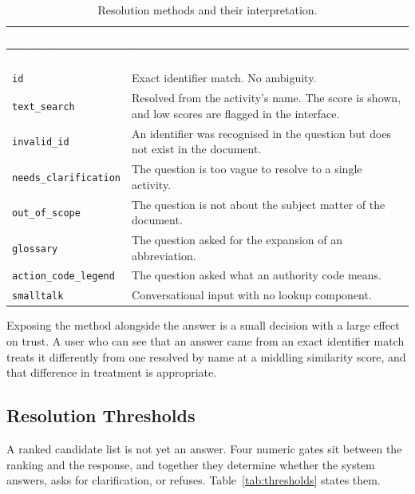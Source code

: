 \begin{longtable}{|p{}|p{}|}
\caption{Resolution methods and their interpretation.}\label{tab:methods}\\
\hline
\rowcolor{myblue}\textcolor{white}{\textbf{Method}} & \textcolor{white}{\textbf{Interpretation}} \\
\hline
\endfirsthead
\hline
\rowcolor{myblue}\textcolor{white}{\textbf{Method}} & \textcolor{white}{\textbf{Interpretation}} \\
\hline
\endhead
\texttt{id} & Exact identifier match. No ambiguity. \\ \hline
\texttt{text\_search} & Resolved from the activity's name. The score is shown, and low scores are flagged in the interface. \\ \hline
\texttt{invalid\_id} & An identifier was recognised in the question but does not exist in the document. \\ \hline
\texttt{needs\_clarification} & The question is too vague to resolve to a single activity. \\ \hline
\texttt{out\_of\_scope} & The question is not about the subject matter of the document. \\ \hline
\texttt{glossary} & The question asked for the expansion of an abbreviation. \\ \hline
\texttt{action\_code\_legend} & The question asked what an authority code means. \\ \hline
\texttt{smalltalk} & Conversational input with no lookup component. \\ \hline
\end{longtable}


Exposing the method alongside the answer is a small decision with a large effect on trust. A user who can see that an answer came from an exact identifier match treats it differently from one resolved by name at a middling similarity score, and that difference in treatment is appropriate.

\subsection{Resolution Thresholds}
\label{sec:confidence}

A ranked candidate list is not yet an answer. Four numeric gates sit between the ranking and
the response, and together they determine whether the system answers, asks for
clarification, or refuses. Table~\ref{tab:thresholds} states them.

